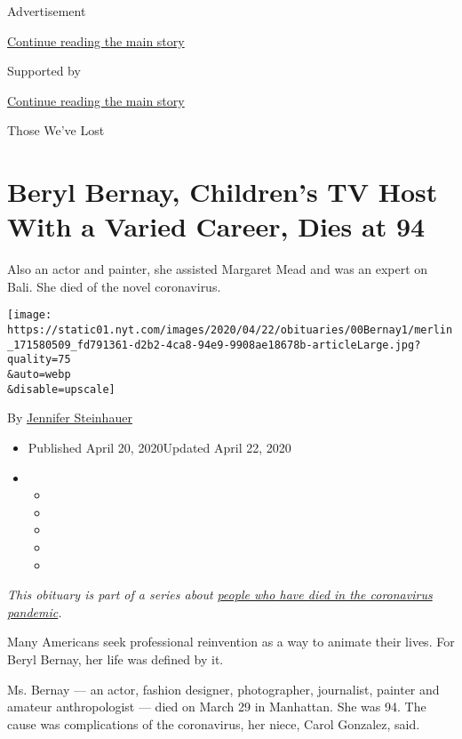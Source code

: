 Advertisement

\protect\hyperlink{after-top}{Continue reading the main story}

Supported by

\protect\hyperlink{after-sponsor}{Continue reading the main story}

Those We've Lost

\hypertarget{beryl-bernay-childrens-tv-host-with-a-varied-career-dies-at-94}{%
\section{Beryl Bernay, Children's TV Host With a Varied Career, Dies at
94}\label{beryl-bernay-childrens-tv-host-with-a-varied-career-dies-at-94}}

Also an actor and painter, she assisted Margaret Mead and was an expert
on Bali. She died of the novel coronavirus.

\texttt{[image: https://static01.nyt.com/images/2020/04/22/obituaries/00Bernay1/merlin\_171580509\_fd791361-d2b2-4ca8-94e9-9908ae18678b-articleLarge.jpg?quality=75\\\&auto=webp\\\&disable=upscale]}

By \href{https://www.nytimes.com/by/jennifer-steinhauer}{Jennifer
Steinhauer}

\begin{itemize}
\item
  Published April 20, 2020Updated April 22, 2020
\item
  \begin{itemize}
  \item
  \item
  \item
  \item
  \item
  \end{itemize}
\end{itemize}

\emph{This obituary is part of a series about}
\href{https://www.nytimes.com/series/people-who-have-died-of-the-coronavirus}{\emph{people
who have died in the coronavirus pandemic}}\emph{.}

Many Americans seek professional reinvention as a way to animate their
lives. For Beryl Bernay, her life was defined by it.

Ms. Bernay --- an actor, fashion designer, photographer, journalist,
painter and amateur anthropologist --- died on March 29 in Manhattan.
She was 94. The cause was complications of the coronavirus, her niece,
Carol Gonzalez, said.

